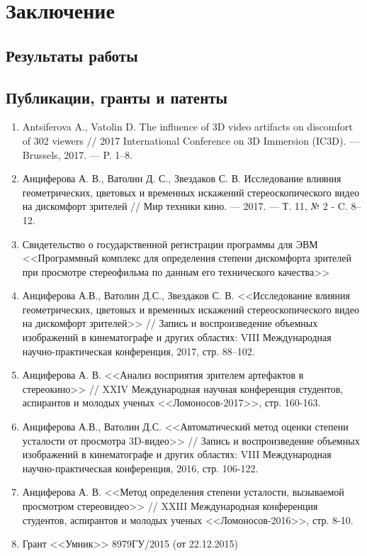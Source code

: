 \section{Заключение}
\subsection{Результаты работы}

\subsection{Публикации, гранты и патенты}
\begin{enumerate}
	\item Antsiferova A., Vatolin D. The influence of 3D video artifacts on discomfort of 302 viewers // 2017 International Conference on 3D Immersion (IC3D). — Brussels, 2017. — P. 1–8.
	\item Анциферова А. В., Ватолин Д. С., Звездаков С. В. Исследование влияния геометрических, цветовых и временных искажений стереоскопического видео на дискомфорт зрителей // Мир техники кино. — 2017. — Т. 11, № 2 - C. 8–12.
	\item Свидетельство  о государственной регистрации программы для ЭВМ <<Программный комплекс для определения степени дискомфорта зрителей при просмотре стереофильма по данным его технического качества>>
	\item Анциферова А.В., Ватолин Д.С., Звездаков С. В. <<Исследование влияния геометрических, цветовых и временных искажений стереоскопического видео на дискомфорт зрителей>> // Запись и воспроизведение объемных изображений в кинематографе и других областях: VIII Международная научно-практическая конференция, 2017, стр. 88–102.
	\item Анциферова А. В. <<Анализ восприятия зрителем артефактов в стереокино>> // XXIV Международная научная конференция студентов, аспирантов и молодых ученых <<Ломоносов-2017>>, стр. 160-163.
	\item Анциферова А.В., Ватолин Д.С. <<Автоматический метод оценки степени усталости от просмотра 3D-видео>> // Запись и воспроизведение объемных изображений в кинематографе и других областях: VIII Международная научно-практическая конференция, 2016, стр. 106-122.
	\item Анциферова А. В. <<Метод определения степени усталости, вызываемой просмотром стереовидео>> // XXIII Международная конференция студентов, аспирантов и молодых ученых <<Ломоносов-2016>>, стр. 8-10.
	\item Грант <<Умник>> \textnumero8979ГУ/2015 (от 22.12.2015)
\end{enumerate}